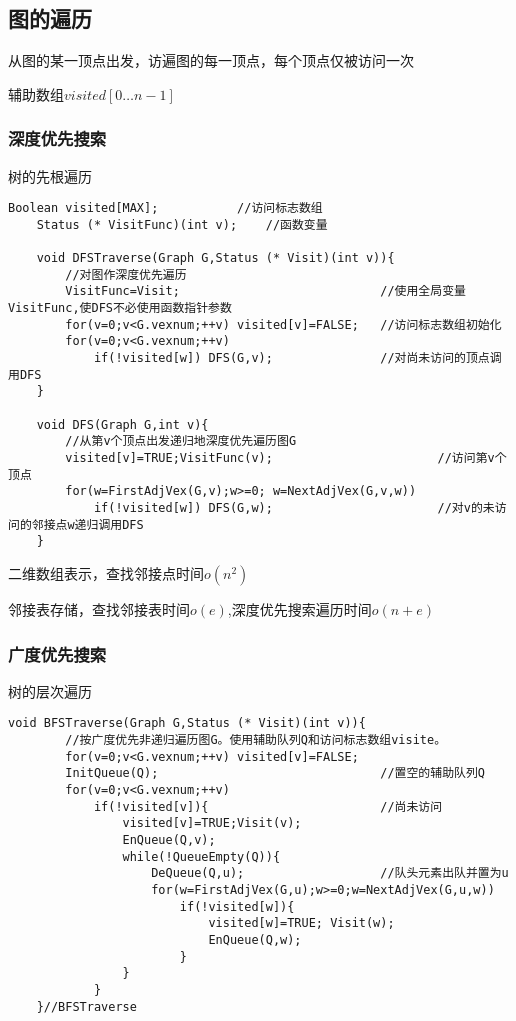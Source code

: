 \documentclass[UTF8]{ctexart}
\begin{document}
\subsection{图的遍历}

从图的某一顶点出发，访遍图的每一顶点，每个顶点仅被访问一次

辅助数组$visited[0 \dots n-1]$

\subsubsection{深度优先搜索}

树的先根遍历

\begin{lstlisting}[style=v1] 
    Boolean visited[MAX];           //访问标志数组
    Status (* VisitFunc)(int v);    //函数变量

    void DFSTraverse(Graph G,Status (* Visit)(int v)){
        //对图作深度优先遍历
        VisitFunc=Visit;                            //使用全局变量VisitFunc,使DFS不必使用函数指针参数
        for(v=0;v<G.vexnum;++v) visited[v]=FALSE;   //访问标志数组初始化
        for(v=0;v<G.vexnum;++v) 
            if(!visited[w]) DFS(G,v);               //对尚未访问的顶点调用DFS
    }

    void DFS(Graph G,int v){
        //从第v个顶点出发递归地深度优先遍历图G
        visited[v]=TRUE;VisitFunc(v);                       //访问第v个顶点
        for(w=FirstAdjVex(G,v);w>=0; w=NextAdjVex(G,v,w))
            if(!visited[w]) DFS(G,w);                       //对v的未访问的邻接点w递归调用DFS
    }

\end{lstlisting}

二维数组表示，查找邻接点时间$o(n^2)$

邻接表存储，查找邻接表时间$o(e)$,深度优先搜索遍历时间$o(n+e)$
 

\newpage

\subsubsection{广度优先搜索}

树的层次遍历

\begin{lstlisting}[style=v1]
    void BFSTraverse(Graph G,Status (* Visit)(int v)){
        //按广度优先非递归遍历图G。使用辅助队列Q和访问标志数组visite。
        for(v=0;v<G.vexnum;++v) visited[v]=FALSE;
        InitQueue(Q);                               //置空的辅助队列Q
        for(v=0;v<G.vexnum;++v)
            if(!visited[v]){                        //尚未访问
                visited[v]=TRUE;Visit(v);
                EnQueue(Q,v);
                while(!QueueEmpty(Q)){
                    DeQueue(Q,u);                   //队头元素出队并置为u
                    for(w=FirstAdjVex(G,u);w>=0;w=NextAdjVex(G,u,w))
                        if(!visited[w]){
                            visited[w]=TRUE; Visit(w);
                            EnQueue(Q,w);
                        }
                }
            }
    }//BFSTraverse

\end{lstlisting}
\end{document}
